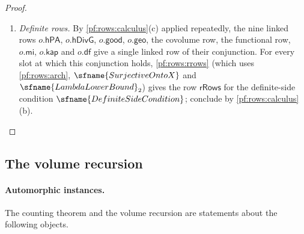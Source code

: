 \begin{proof}
\begin{enumerate}[label=\arabic*.]
to the point by the reciprocity linkage. By , global Artin reciprocity
implies that for every parameter set $p$ and every linkage whose bundles have reciprocity-linked records, the
selections built from good points of $p$ serve their classes (the service row for the slot $\rowsGood(p.s)$); and
 turns this row into the linked row $\mathsf{hServ}$.
\item \emph{Definite rows.} By \cref{pf:rows:calculus}(c) applied repeatedly, the nine linked rows $o.\mathsf{hPA}$,
$o.\mathsf{hDivG}$, $o.\mathsf{good}$, $o.\mathsf{geo}$, the covolume row, the functional row, $o.\mathsf{mi}$,
$o.\mathsf{kap}$ and $o.\mathsf{df}$ give a single linked row of their conjunction. For every slot at which this
conjunction holds, \cref{pf:rows:rrows} (which uses \cref{pf:rows:arch}, $\sfname{SurjectiveOntoX}$ and
$\sfname{LambdaLowerBound}_2$) gives the row $\mathsf{rRows}$ for the definite-side condition
$\sfname{DefiniteSideCondition}$; conclude by \cref{pf:rows:calculus}(b).\qedhere
\end{enumerate}
\end{proof}

\subsection{The volume recursion}\label{sec:pf:rows:volume}

\paragraph{Automorphic instances.}
The counting theorem and the volume recursion are statements about the following objects.

